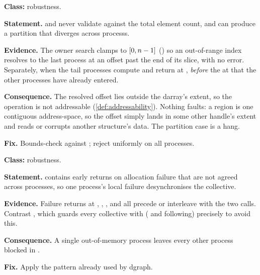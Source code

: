 \begin{deviation}\label{dev:darray-bounds}
\textbf{Class:} robustness.

\textbf{Statement.}  and 
never validate  against the total element count, and
 can produce a \gls{partition} that diverges
across \glspl{process}.

\textbf{Evidence.} The owner search clamps to $[0, n-1]$
() so an out-of-range index resolves to the last
process at an offset past the end of its slice, with no error. Separately, when
 the tail processes compute
 and return  at
, \emph{before} the  at
 that the other processes have already entered.

\textbf{Consequence.} The resolved offset lies outside the darray's extent, so
the operation is not addressable (\cref{def:addressability}). Nothing faults:
a \gls{region} is one contiguous \gls{address-space}, so the offset simply
lands in some other handle's extent and reads or corrupts another structure's
data. The partition case is a hang.

\textbf{Fix.} Bounds-check against ; reject
 uniformly on all processes.
\end{deviation}

\begin{deviation}\label{dev:noncollective}
\textbf{Class:} robustness.

\textbf{Statement.}  contains early returns on
allocation failure that are not agreed across processes, so one process's local
failure desynchronises the collective.

\textbf{Evidence.} Failure returns at ,
, ,  and
 all precede or interleave with the two
 calls. Contrast , which
guards every collective with 
( and following) precisely to avoid this.

\textbf{Consequence.} A single out-of-memory process leaves every other process
blocked in .

\textbf{Fix.} Apply the  pattern already used by
dgraph.
\end{deviation}

